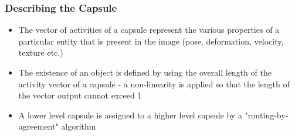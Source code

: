 \documentclass{beamer}
\begin{document}
\begin{frame}
\frametitle{Describing the Capsule}
\center
\begin{itemize}
	\item The vector of activities of a capsule represent the various properties of a particular entity that is present in the image (pose, deformation, velocity, texture etc.)
	\item The existence of an object is defined by using the overall length of the activity vector of a capsule - a non-linearity is applied so that the length of the vector output cannot exceed 1
	\item A lower level capsule is assigned to a higher level capsule by a "routing-by-agreement" algorithm
\end{itemize}
\end{frame}
\end{document}

